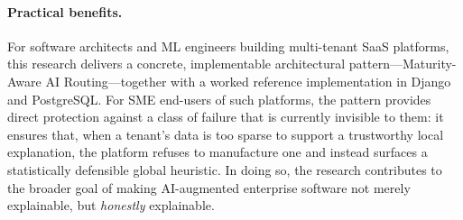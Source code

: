 \paragraph{Practical benefits.}
For software architects and ML engineers building multi-tenant SaaS platforms, this research delivers a concrete, implementable architectural pattern---Maturity-Aware AI Routing---together with a worked reference implementation in Django and PostgreSQL. For SME end-users of such platforms, the pattern provides direct protection against a class of failure that is currently invisible to them: it ensures that, when a tenant's data is too sparse to support a trustworthy local explanation, the platform refuses to manufacture one and instead surfaces a statistically defensible global heuristic. In doing so, the research contributes to the broader goal of making AI-augmented enterprise software not merely explainable, but \emph{honestly} explainable.
